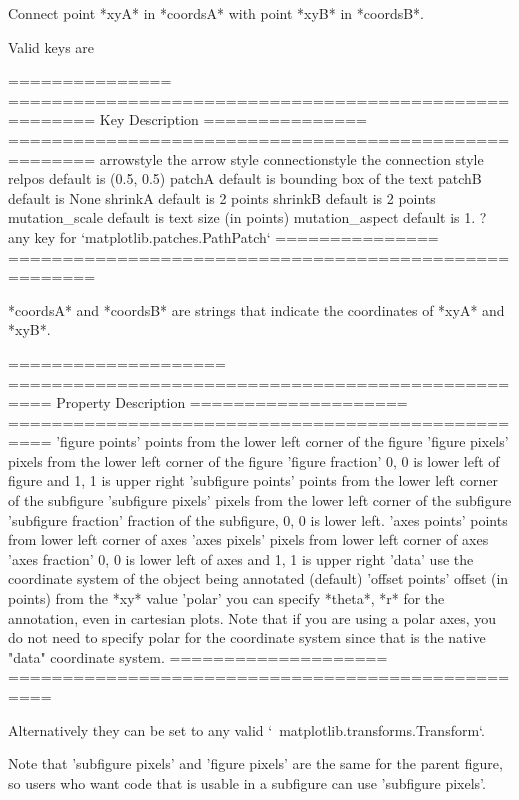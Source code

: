 \begin{DoxyVerb}Connect point *xyA* in *coordsA* with point *xyB* in *coordsB*.

Valid keys are

===============  ======================================================
Key              Description
===============  ======================================================
arrowstyle       the arrow style
connectionstyle  the connection style
relpos           default is (0.5, 0.5)
patchA           default is bounding box of the text
patchB           default is None
shrinkA          default is 2 points
shrinkB          default is 2 points
mutation_scale   default is text size (in points)
mutation_aspect  default is 1.
?                any key for `matplotlib.patches.PathPatch`
===============  ======================================================

*coordsA* and *coordsB* are strings that indicate the
coordinates of *xyA* and *xyB*.

==================== ==================================================
Property             Description
==================== ==================================================
'figure points'      points from the lower left corner of the figure
'figure pixels'      pixels from the lower left corner of the figure
'figure fraction'    0, 0 is lower left of figure and 1, 1 is upper
             right
'subfigure points'   points from the lower left corner of the subfigure
'subfigure pixels'   pixels from the lower left corner of the subfigure
'subfigure fraction' fraction of the subfigure, 0, 0 is lower left.
'axes points'        points from lower left corner of axes
'axes pixels'        pixels from lower left corner of axes
'axes fraction'      0, 0 is lower left of axes and 1, 1 is upper right
'data'               use the coordinate system of the object being
             annotated (default)
'offset points'      offset (in points) from the *xy* value
'polar'              you can specify *theta*, *r* for the annotation,
             even in cartesian plots.  Note that if you are
             using a polar axes, you do not need to specify
             polar for the coordinate system since that is the
             native "data" coordinate system.
==================== ==================================================

Alternatively they can be set to any valid
`~matplotlib.transforms.Transform`.

Note that 'subfigure pixels' and 'figure pixels' are the same
for the parent figure, so users who want code that is usable in
a subfigure can use 'subfigure pixels'.


\end{DoxyVerb}
